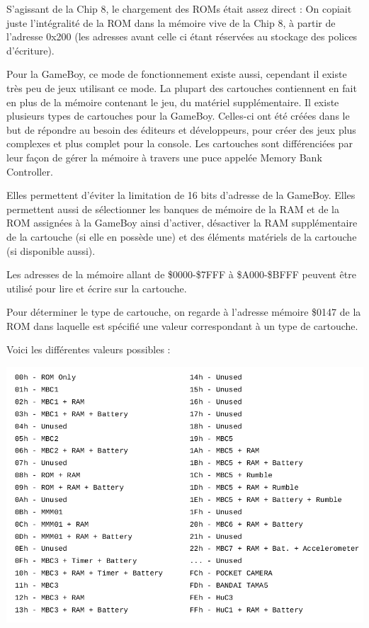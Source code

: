 \documentclass[12pt, a4paper]{article}
\begin{document}
S'agissant de la Chip 8, le chargement des ROMs était assez direct : On copiait juste l'intégralité de la ROM dans la mémoire vive de la Chip 8, à partir de l'adresse 0x200 (les adresses avant celle ci étant réservées au stockage des polices d'écriture).
\pagebreak

\bigskip
Pour la GameBoy, ce mode de fonctionnement existe aussi, cependant il existe très peu de jeux utilisant ce mode. La plupart des cartouches contiennent en fait en plus de la mémoire contenant le jeu, du matériel supplémentaire.
\bigskip
Il existe plusieurs types de cartouches pour la GameBoy. Celles-ci ont été créées dans le but de répondre au besoin des éditeurs et développeurs, pour créer des jeux plus complexes et plus complet pour la console. Les cartouches sont différenciées par leur façon de gérer la mémoire à travers une puce appelée Memory Bank Controller. 

\bigskip
Elles permettent d'éviter la limitation de 16 bits d'adresse de la GameBoy. Elles permettent aussi de sélectionner les banques de mémoire de la RAM et de la ROM assignées à la GameBoy ainsi d'activer, désactiver la RAM supplémentaire de la cartouche (si elle en possède une) et des éléments matériels de la cartouche (si disponible aussi).

\bigskip

Les adresses de la mémoire allant de \$0000-\$7FFF à \$A000-\$BFFF peuvent être utilisé pour lire et écrire sur la cartouche. 

\bigskip

Pour déterminer le type de cartouche, on regarde à l'adresse mémoire \$0147 de la ROM dans laquelle est spécifié une valeur correspondant à un type de cartouche.

\bigskip
\pagebreak
\bigskip
Voici les différentes valeurs possibles :

\bigskip
\bigskip
\bigskip

\includegraphics[width = 14.5 cm]{MBCtype.png}
\end{document}
